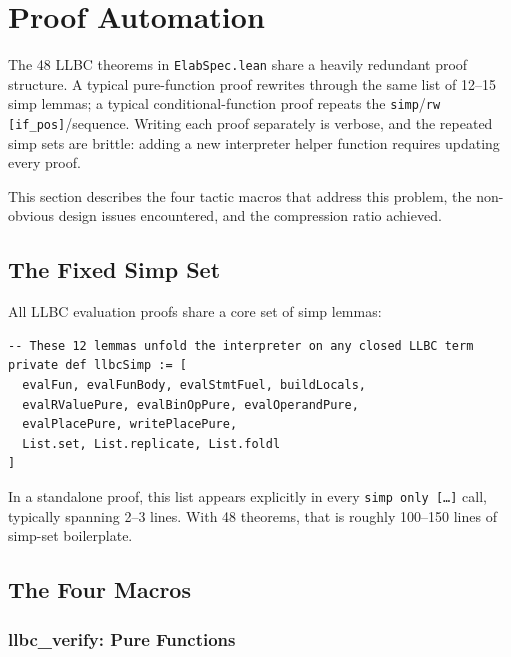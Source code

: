 
\section{Proof Automation}
\label{sec:automation}

The 48 LLBC theorems in \texttt{ElabSpec.lean} share a heavily redundant
proof structure. A typical pure-function proof rewrites through the same
list of 12--15 simp lemmas; a typical conditional-function proof repeats
the \texttt{simp}/\texttt{rw [if\_pos]}/\rfl sequence. Writing each proof
separately is verbose, and the repeated simp sets are brittle: adding a
new interpreter helper function requires updating every proof.

This section describes the four tactic macros that address this problem,
the non-obvious design issues encountered, and the compression ratio achieved.

\subsection{The Fixed Simp Set}

All LLBC evaluation proofs share a core set of simp lemmas:

\begin{lstlisting}[caption={The shared LLBC simp set.},label={lst:simpset}]
-- These 12 lemmas unfold the interpreter on any closed LLBC term
private def llbcSimp := [
  evalFun, evalFunBody, evalStmtFuel, buildLocals,
  evalRValuePure, evalBinOpPure, evalOperandPure,
  evalPlacePure, writePlacePure,
  List.set, List.replicate, List.foldl
]
\end{lstlisting}

In a standalone proof, this list appears explicitly in every \texttt{simp only
[\ldots]} call, typically spanning 2--3 lines. With 48 theorems, that is
roughly 100--150 lines of simp-set boilerplate.

\subsection{The Four Macros}

\subsubsection{llbc\_verify: Pure Functions}

